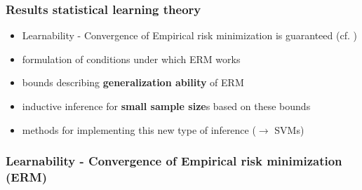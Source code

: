 \begin{frame}\frametitle{Results statistical learning theory}
		\begin{itemize}
			\item Learnability - Convergence of Empirical risk minimization is guaranteed (cf. )
			\item formulation of conditions under which ERM works
			\item bounds describing \textbf{generalization ability} of ERM 
			\item inductive inference for \textbf{small sample size}s 
				based on these bounds
			\item methods for implementing this new type 
				of inference ($\rightarrow$ {SVMs})
		\end{itemize}
\end{frame}

\subsubsection{Learnability - Convergence of Empirical risk minimization (ERM)}

